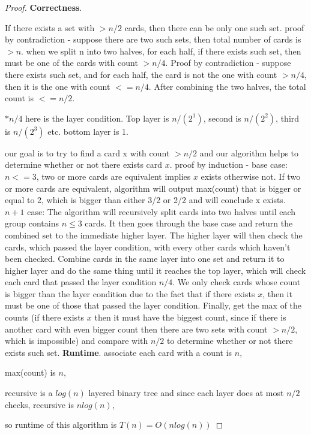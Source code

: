 \documentclass[paper=a4, fontsize=11pt]{scrartcl} %
\numberwithin{equation}{section} %
\numberwithin{figure}{section} %
\numberwithin{table}{section} %
\newenvironment{myproof}{\begin{proof}\setlength{\parindent}{2em}}{\end{proof}}
\begin{document}
\begin{myproof}
\textbf{Correctness}. 
\begin{comment}
We can prove lemma \ref{lemma1} and lemma \ref{lemma2} by contradiction. If both of the subsets have less than $n/4$ cards equivalent to $x$, then there are less than $n/2$ cards equivalent to $x$ in the collection of $n$ cards, that contradicts the fact. Meanwhile, if there are more than $n/2$ cards equivalent to $x_1$ and also there are more than $n/2$ cards equivalent to $x_2$, then there should be at least $n+2$ cards, that also contradicts the fact.

According to \ref{lemma1}, if $x$ exists, there must be 
\end{comment}
If there exists a set with $> n/2$ cards, then there can be only one such set.
proof by contradiction - suppose there are two such sets, then total number of cards 
is $> n$.
when we split n into two halves, for each half, if there exists such set, then must be one
of the cards with count $> n/4$. Proof by contradiction - suppose there exists such set, and 
for each half, the card is not the one with count $> n/4$, then it is the one with count $<= n/4$. After combining the two halves, the total count is $<= n/2$.
  
  $*n/4$ here is the layer condition. Top layer is $n/(2^1)$, second is $n/(2^2)$, third is $n/(2^3)$ etc. bottom layer is 1.

our goal is to try to find a card x with count $> n/2$ and our algorithm helps to determine 
whether or not there exists card $x$.
proof by induction - base case: $n <= 3$, two or more cards are equivalent implies $x$ exists otherwise 
not. If two or more cards are equivalent, algorithm will output max(count) that is bigger or equal to 2, 
which is bigger than either 3/2 or 2/2 and will conclude x exists.
$n+1$ case: The algorithm will recursively split cards into two halves until each group contains $n \leq 3$ cards.
It then goes through the base case and return the combined set to the immediate higher layer. The higher layer will 
then check the cards, which passed the layer condition, with every other cards which haven't been checked. Combine 
cards in the same layer into one set and return it to higher layer and do the same thing until it reaches the top layer, 
which will check each card that passed the layer condition $n/4$. We only check cards whose count is bigger than
the layer condition due to the fact that if there exists $x$, then it must be one of those that passed the layer condition.
Finally, get the max of the counts (if there exists $x$ then it must have the biggest count, since if there is another card
with even bigger count then there are two sets with count $> n/2$, which is impossible) and compare with $n/2$ to determine 
whether or not there exists such set.   
\textbf{Runtime}.
associate each card with a count is $n$,
 
max(count) is $n$,

recursive is a $log(n)$ layered binary tree and since each layer does at most $n/2$ checks, recursive is $nlog(n)$,

so runtime of this algorithm is $T(n) = O(nlog(n))$
\end{myproof}
\end{document}
